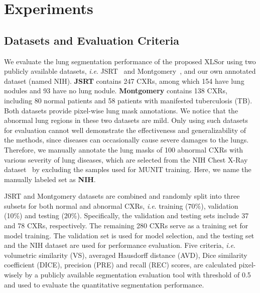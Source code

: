 \documentclass{midl} \usepackage{multirow}
\newcommand{\ie}{\textit{i}.\textit{e}. }
\begin{document}
\section{Experiments}
\subsection{Datasets and Evaluation Criteria}
We evaluate the lung segmentation performance of the proposed XLSor using two publicly available datasets, \ie JSRT~\cite{JSRT} and Montgomery~\cite{TB_data}, and our own annotated dataset (named NIH). \textbf{JSRT} contains 247 CXRs, among which 154 have lung nodules and 93 have no lung nodule. \textbf{Montgomery} contains 138 CXRs, including 80 normal patients and 58 patients with manifested tuberculosis (TB). Both datasets provide pixel-wise lung mask annotations. We notice that the abnormal lung regions in these two datasets are mild. Only using such datasets for evaluation cannot well demonstrate the effectiveness and generalizability of the methods, since diseases can occasionally cause severe damages to the lungs. Therefore, we manually annotate the lung masks of 100 abnormal CXRs with various severity of lung diseases, which are selected from the NIH Chest X-Ray dataset~\cite{Wang_cvpr17} by excluding the samples used for MUNIT training. Here, we name the manually labeled set as \textbf{NIH}.

JSRT and Montgomery datasets are combined and randomly split into three subsets for both normal and abnormal CXRs, \ie training (70\%), validation (10\%) and testing (20\%). Specifically, the validation and testing sets include 37 and 78 CXRs, respectively. The remaining 280 CXRs serve as a training set for model training. The validation set is used for model selection, and the testing set and the NIH dataset are used for performance evaluation. Five criteria, \ie volumetric similarity (VS), averaged Hausdorff distance (AVD), Dice similarity coefficient (DICE), precision (PRE) and recall (REC) scores, are calculated pixel-wisely by a publicly available segmentation evaluation tool \cite{taha2015metrics} with threshold of 0.5 and used to evaluate the quantitative segmentation performance.
\end{document}
